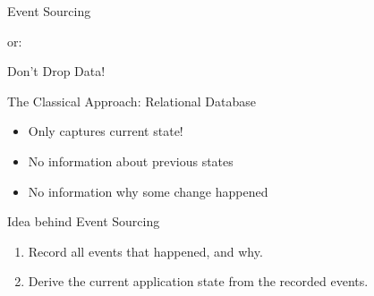 \begin{frame}[fragile]{}

\begin{center}
{
\LARGE
Event Sourcing
}

\vspace{2em}

or:

\vspace{2em}

{
\Large
Don't Drop Data!
}
\end{center}
\end{frame}

\begin{frame}[fragile]{The Classical Approach: Relational Database}

\begin{itemize}                
\item Only captures current state!
\item No information about previous states
\item No information why some change happened
\end{itemize}
                   
\end{frame}

\begin{frame}[fragile]{Idea behind Event Sourcing}

\begin{enumerate}
\item Record all events that happened, and why.
\item Derive the current application state from the recorded events.
\end{enumerate}         



\end{frame}


